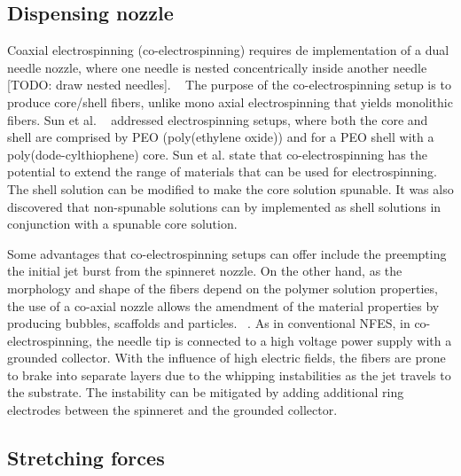 \documentclass[5p,,preprint,12pt,twocolumn]{elsarticle}
\begin{document}
\subsection{Dispensing nozzle}Coaxial electrospinning (co-electrospinning) requires de implementation of a dual needle nozzle, where one needle is nested concentrically inside another needle [TODO: draw nested needles]. \unskip~\cite{527120:13914792,527120:13914793} The purpose of the co-electrospinning setup is to produce core/shell fibers, unlike mono axial electrospinning that yields monolithic fibers. Sun et al. \unskip~\cite{527120:13914312} addressed electrospinning setups, where both the core and shell are comprised by PEO (poly(ethylene oxide)) and for a PEO shell with a poly(dode-cylthiophene) core. Sun et al. state that co-electrospinning has the potential to extend the range of materials that can be used for electrospinning. The shell solution can be modified to make the core solution spunable. It was also discovered that non-spunable solutions can by implemented as shell solutions in conjunction with a spunable core solution. \unskip~\cite{527120:13914968}

Some advantages that co-electrospinning setups can offer include the preempting the initial jet burst from the spinneret nozzle. On the other hand, as the morphology and shape of the fibers depend on the polymer solution properties, the use of a co-axial nozzle allows the amendment of the material properties by producing bubbles, scaffolds and particles. \unskip~\cite{527120:13914748,527120:13914750}. As in conventional NFES, in co-electrospinning, the needle tip is connected to a high voltage power supply with a grounded collector. With the influence of high electric fields, the fibers are prone to brake into separate layers due to the whipping instabilities as the jet travels to the substrate. The instability can be mitigated by adding additional ring electrodes between the spinneret and the grounded collector. \unskip~\cite{527120:13915304}



\subsection{Stretching forces}
\end{document}
